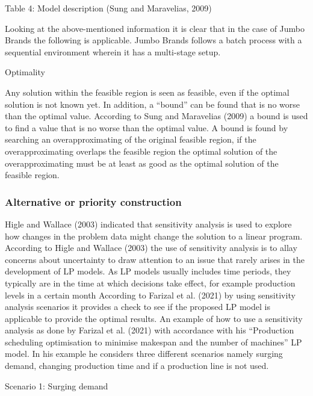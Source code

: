 \documentclass[a4paper,11pt,fleqn]{report}
\begin{document}
                Table 4: Model description (Sung and Maravelias, 2009)
                
                Looking at the above-mentioned information it is clear that in the case of Jumbo Brands the following is applicable. Jumbo Brands follows a batch process with a sequential environment wherein it has a multi-stage setup.
                
            Optimality
            
                Any solution within the feasible region is seen as feasible, even if the optimal solution is not known yet. In addition, a “bound” can be found that is no worse than the optimal value. According to Sung and Maravelias (2009) a bound is used to find a value that is no worse than the optimal value. A bound is found by searching an overapproximating of the original feasible region, if the overapproximating overlaps the feasible region the optimal solution of the overapproximating must be at least as good as the optimal solution of the feasible region.
            
            \subsubsection{Alternative or priority construction}
                Higle and Wallace (2003) indicated that sensitivity analysis is used to explore how changes in the problem data might change the solution to a linear program. According to Higle and Wallace (2003) the use of sensitivity analysis is to allay concerns about uncertainty to draw attention to an issue that rarely arises in the development of LP models. As LP models usually includes time periods, they typically are in the time at which decisions take effect, for example production levels in a certain month
                According to Farizal et al. (2021) by using sensitivity analysis scenarios it provides a check to see if the proposed LP model is applicable to provide the optimal results. An example of how to use a sensitivity analysis as done by Farizal et al. (2021) with accordance with his “Production scheduling optimisation to minimise makespan and the number of machines” LP model. In his example he considers three different scenarios namely surging demand, changing production time and if a production line is not used.
                
                Scenario 1: Surging demand
                
\end{document}
